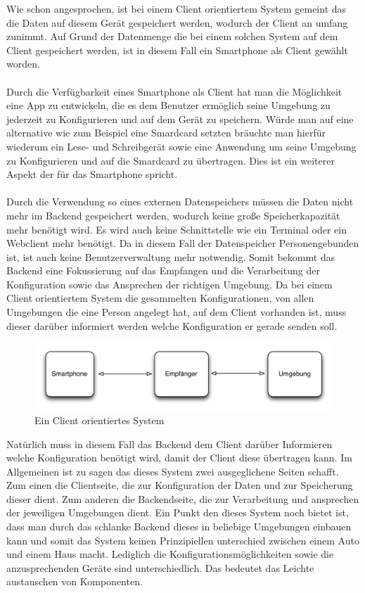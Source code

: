 Wie schon angesprochen, ist bei einem Client orientiertem System gemeint das die Daten auf diesem Gerät gespeichert werden, wodurch der Client an umfang zunimmt. Auf Grund der Datenmenge die bei einem solchen System auf dem Client gespeichert werden, ist in diesem Fall ein Smartphone als Client gewählt worden.  
\\\\
Durch die Verfügbarkeit eines Smartphone als Client hat man die Möglichkeit eine App zu entwickeln, die es dem Benutzer ermöglich seine Umgebung zu jederzeit zu Konfigurieren und auf dem Gerät zu speichern. Würde man auf eine alternative wie zum Beispiel eine Smardcard setzten bräuchte man hierfür wiederum ein Lese- und Schreibgerät sowie eine Anwendung um seine Umgebung zu Konfigurieren und auf die Smardcard zu übertragen. Dies ist ein weiterer Aspekt der für das Smartphone spricht.
\\\\
Durch die Verwendung so eines externen Datenspeichers müssen die Daten nicht mehr im Backend gespeichert werden, wodurch keine große Speicherkapazität mehr benötigt wird. Es wird auch keine Schnittstelle wie ein Terminal oder ein Webclient mehr benötigt. Da in diesem Fall der Datenspeicher Personengebunden ist, ist auch keine Benutzerverwaltung mehr notwendig. Somit bekommt das Backend eine Fokussierung auf das Empfangen und die Verarbeitung der Konfiguration sowie das Ansprechen der richtigen Umgebung.
Da bei einem Client orientiertem System die gesammelten Konfigurationen, von allen Umgebungen die eine Person angelegt hat, auf dem Client vorhanden ist, muss dieser darüber informiert werden welche Konfiguration er gerade senden soll. 
\begin{figure}[H]
\includegraphics[width=12.5cm]{images/client}
\caption{Ein Client orientiertes System}
\end{figure}
Natürlich muss in diesem Fall das Backend dem Client darüber Informieren welche Konfiguration benötigt wird, damit der Client diese übertragen kann. Im Allgemeinen ist zu sagen das dieses System zwei ausgeglichene Seiten schafft. Zum einen die Clientseite, die zur Konfiguration der Daten und zur Speicherung dieser dient. Zum anderen die Backendseite, die zur Verarbeitung und ansprechen der jeweiligen Umgebungen dient. Ein Punkt den dieses System noch bietet ist, dass man durch das schlanke Backend dieses in beliebige Umgebungen einbauen kann und somit das System keinen Prinzipiellen unterschied zwischen einem Auto und einem Haus macht. Lediglich die Konfigurationsmöglichkeiten sowie die anzusprechenden Geräte sind unterschiedlich. Das bedeutet das Leichte austauschen von Komponenten.

